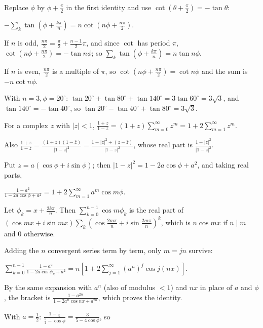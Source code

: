   Replace $\phi$ by $\phi + \frac{\pi}{2}$ in the first identity and use $\cot\left(\theta + \frac{\pi}{2}\right)
  = -\tan\theta$:

  $-\displaystyle\sum_k\tan\left(\phi + \frac{k\pi}{n}\right) = n\cot\left(n\phi + \frac{n\pi}{2}\right)$.

  If $n$ is odd, $\frac{n\pi}{2} = \frac{\pi}{2} + \frac{n - 1}{2}\pi$, and since $\cot$ has period $\pi$,
  $\cot\left(n\phi + \frac{n\pi}{2}\right) = -\tan n\phi$; so $\displaystyle\sum_k\tan\left(\phi +
    \frac{k\pi}{n}\right) = n\tan n\phi$.

  If $n$ is even, $\frac{n\pi}{2}$ is a multiple of $\pi$, so $\cot\left(n\phi + \frac{n\pi}{2}\right) = \cot
  n\phi$ and the sum is $-n\cot n\phi$.

  With $n = 3, \phi = 20^\circ$: $\tan20^\circ + \tan80^\circ + \tan140^\circ = 3\tan60^\circ = 3\sqrt{3}$, and
  $\tan140^\circ = -\tan40^\circ$, so $\tan20^\circ - \tan40^\circ + \tan80^\circ = 3\sqrt{3}$.
\item For a complex $z$ with $|z| < 1$, $\frac{1 + z}{1 - z} = (1 + z)\displaystyle\sum_{m = 0}^\infty z^m =
  1 + 2\sum_{m = 1}^\infty z^m$.

  Also $\frac{1 + z}{1 - z} = \frac{(1 + z)(1 - \bar{z})}{|1 - z|^2} = \frac{1 - |z|^2 + (z - \bar{z})}{|1 -
    z|^2}$, whose real part is $\frac{1 - |z|^2}{|1 - z|^2}$.

  Put $z = a(\cos\phi + i\sin\phi)$; then $|1 - z|^2 = 1 - 2a\cos\phi + a^2$, and taking real parts,

  $\frac{1 - a^2}{1 - 2a\cos\phi + a^2} = 1 + 2\displaystyle\sum_{m = 1}^\infty a^m\cos m\phi$.

  Let $\phi_k = x + \frac{2k\pi}{n}$. Then $\displaystyle\sum_{k = 0}^{n - 1}\cos m\phi_k$ is the real part of
  $(\cos mx + i\sin mx)\displaystyle\sum_k\left(\cos\frac{2m\pi}{n} + i\sin\frac{2m\pi}{n}\right)^k$, which is $n\cos
  mx$ if $n\mid m$ and $0$ otherwise.

  Adding the $n$ convergent series term by term, only $m = jn$ survive:

  $\displaystyle\sum_{k = 0}^{n - 1}\frac{1 - a^2}{1 - 2a\cos\phi_k + a^2} = n\left[1 + 2\sum_{j = 1}^\infty(a^n)^j\cos
  j(nx)\right]$.

  By the same expansion with $a^n$ (also of modulus $< 1$) and $nx$ in place of $a$ and $\phi$, the bracket is
  $\frac{1 - a^{2n}}{1 - 2a^n\cos nx + a^{2n}}$, which proves the identity.

  With $a = \frac{1}{2}$: $\frac{1 - \frac{1}{4}}{\frac{5}{4} - \cos\phi} = \frac{3}{5 - 4\cos\phi}$, so

